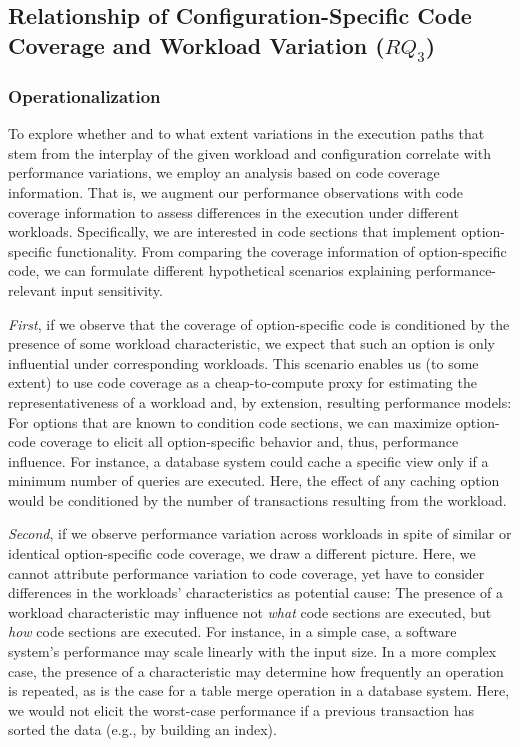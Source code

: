 {{\subsection{Relationship of Configuration-Specific Code Coverage and Workload Variation ($RQ_3$)}\label{sec:rq3}\label{sec:categories}
\subsubsection{Operationalization}To explore whether and to what extent variations in the execution paths that stem from the interplay of the given workload and configuration correlate with performance variations, we employ an analysis based on code coverage information. That is, we augment our performance observations with code coverage information to assess differences in the execution under different workloads. Specifically, we are interested in code sections that implement option-specific functionality. From comparing the coverage information of option-specific code, we can formulate different hypothetical scenarios explaining performance-relevant input sensitivity. 

\textit{First}, if we observe that the  coverage of option-specific code is conditioned by the presence of some workload characteristic, we expect that such an option is only influential under corresponding workloads. This scenario enables us (to some extent) to use code coverage as a cheap-to-compute proxy for estimating the representativeness of a workload and, by extension, resulting performance models: For options that are known to condition code sections, we can maximize option-code coverage to elicit all option-specific behavior and, thus, performance influence. For instance, a database system could cache a specific view only if a minimum number of queries are executed. Here, the effect of any caching option would be conditioned by the number of transactions resulting from the workload.

\textit{Second}, if we observe performance variation across workloads in spite of similar or identical option-specific code coverage, we draw a different picture. Here, we cannot attribute performance variation to code coverage, yet have to consider differences in the workloads’ characteristics as potential cause: The presence of a workload characteristic may influence not  \emph{what} code sections are executed, but \emph{how} code sections are executed. For instance, in a simple case, a software system’s performance may scale linearly with the input size. In a more complex case, the presence of a characteristic may determine how frequently an operation is repeated, as is the case for a table merge operation in a database system. Here, we would not elicit the worst-case performance if a previous transaction has sorted the data (e.g., by building an index).

}}
